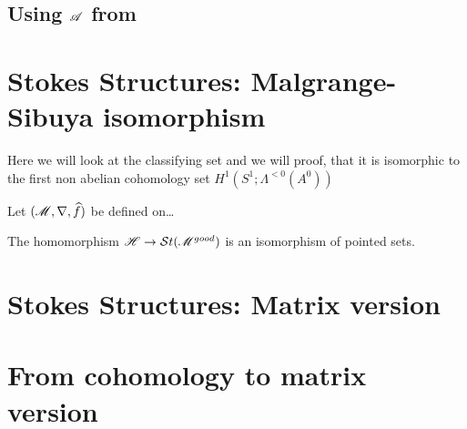 \subsection{Using $\mathscr{A}$ from \cite{sabbah2007isomonodromic}}

\section{Stokes Structures: Malgrange-Sibuya isomorphism}
\begin{comment}
  \begin{itemize}
    \item \cite{Loday1994} Thm I.2.1
    \item \cite{Loday2014} Thm. 4.3.9, on p. 78
    \item \cite{sabbah2007isomonodromic} Thm II.6.2
  \end{itemize}
\end{comment}
Here we will look at the classifying set and we will proof, that it is
isomorphic \TODO[as\dots] to the first non abelian cohomology set
$H^1(S^1;\Lambda^{<0}(A^0))$

Let $(\mathscr{M},\nabla,\widehat f)$ be defined on\dots

\begin{thm}
  The homomorphism $\mathscr{H}\to\mathcal{S}{}t(\mathscr{M}^{good})$ is an isomorphism of pointed sets.
\end{thm}



\section{Stokes Structures: Matrix version}
\section{From cohomology to matrix version}
